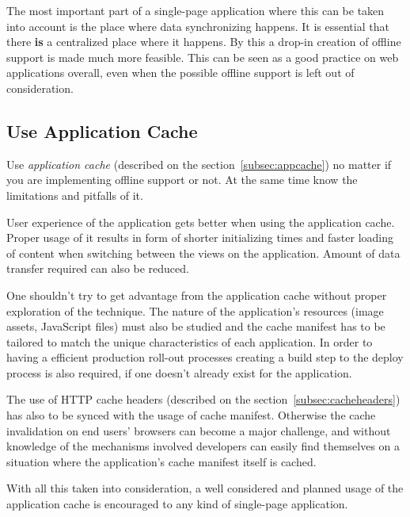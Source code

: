 The most important part of a single-page application where this can be taken into account is the place where data synchronizing happens. It is essential that there \textbf{is} a centralized place where it happens. By this a drop-in creation of offline support is made much more feasible. This can be seen as a good practice on web applications overall, even when the possible offline support is left out of consideration. 






\subsection{Use Application Cache}


Use \textit{application cache} (described on the section~\ref{subsec:appcache}) no matter if you are implementing offline support or not. At the same time know the limitations and pitfalls of it.

User experience of the application gets better when using the application cache. Proper usage of it results in form of shorter initializing times and faster loading of content when switching between the views on the application. Amount of data transfer required can also be reduced. 

One shouldn't try to get advantage from the application cache without proper exploration of the technique. The nature of the application's resources (image assets, JavaScript files) must also be studied and the cache manifest has to be tailored to match the unique characteristics of each application. In order to having a efficient production roll-out processes creating a build step to the deploy process is also required, if one doesn't already exist for the application.

The use of HTTP cache headers (described on the section~\ref{subsec:cacheheaders}) has also to be synced with the usage of cache manifest. Otherwise the cache invalidation on end users' browsers can become a major challenge, and without knowledge of the mechanisms involved developers can easily find themselves on a situation where the application's cache manifest itself is cached. 

With all this taken into consideration, a well considered and planned usage of the application cache is encouraged to any kind of single-page application.








